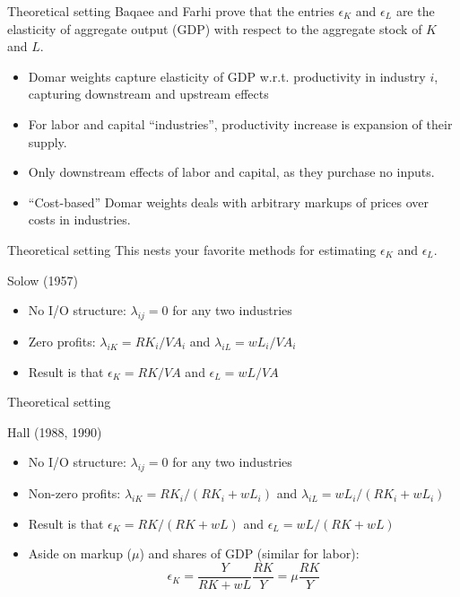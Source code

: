\documentclass[10pt, xcolor=dvipsnames]{beamer}
\begin{document}
\begin{frame}{Theoretical setting}
Baqaee and Farhi prove that the entries $\epsilon_K$ and $\epsilon_L$ are the elasticity of aggregate output (GDP) with respect to the aggregate stock of $K$ and $L$. 

\begin{itemize}
  \item Domar weights capture elasticity of GDP w.r.t. productivity in industry $i$, capturing downstream and upstream effects
  \item For labor and capital ``industries'', productivity increase is expansion of their supply.
  \item Only downstream effects of labor and capital, as they purchase no inputs.
  \item ``Cost-based'' Domar weights deals with arbitrary markups of prices over costs in industries. 
\end{itemize}

\end{frame}

\begin{frame}{Theoretical setting}
This nests your favorite methods for estimating $\epsilon_K$ and $\epsilon_L$.
\vspace{.25in}

Solow (1957)
\begin{itemize}
  \item No I/O structure: $\lambda_{ij} = 0$ for any two industries
  \item Zero profits: $\lambda_{iK} = RK_i/VA_i$ and $\lambda_{iL} = wL_i/VA_i$
  \item Result is that $\epsilon_K = RK/VA$ and $\epsilon_L = wL/VA$
\end{itemize}

\end{frame}

\begin{frame}{Theoretical setting}

Hall (1988, 1990)
\begin{itemize}
  \item No I/O structure: $\lambda_{ij} = 0$ for any two industries
  \item Non-zero profits: $\lambda_{iK} = RK_i/(RK_i + wL_i)$ and $\lambda_{iL} = wL_i/(RK_i + wL_i)$
  \item Result is that $\epsilon_K = RK/(RK+wL)$ and $\epsilon_L = wL/(RK+wL)$
  \item Aside on markup ($\mu$) and shares of GDP (similar for labor):
    \begin{equation}
      \epsilon_K = \frac{Y}{RK+wL}\frac{RK}{Y} = \mu \frac{RK}{Y}
    \end{equation}
\end{itemize}

\end{frame}
\end{document}
